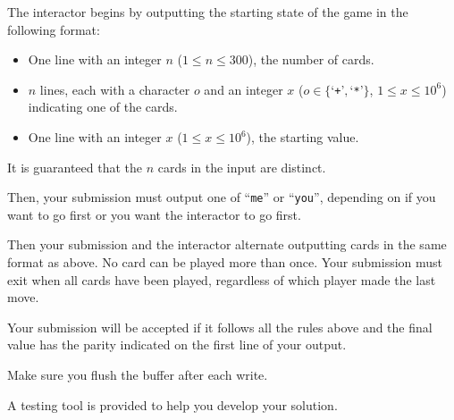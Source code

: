 
  The interactor begins by outputting the starting state of the game in the following format:
  \begin{itemize}
    \item One line with an integer $n$ ($1 \le n \le 300$), the number of cards.
    \item $n$ lines, each with a character $o$ and an integer $x$ ($o \in \{$`\texttt{+}'$, $`\texttt{*}'$\}$, $1 \le x \le 10^6$) indicating one of the cards.
    \item One line with an integer $x$ ($1 \le x \le 10^6$), the starting value.
  \end{itemize}
  It is guaranteed that the $n$ cards in the input are distinct.

  Then, your submission must output one of ``\texttt{me}'' or ``\texttt{you}'', depending on if you want to go first or you want the interactor to go first.

  Then your submission and the interactor alternate outputting cards in the same format as above.
  No card can be played more than once.
  Your submission must exit when all cards have been played, regardless of which player made the last move.

  Your submission will be accepted if it follows all the rules above and the final value has the parity indicated on the first line of your output.

  Make sure you flush the buffer after each write.

  A testing tool is provided to help you develop your solution.
